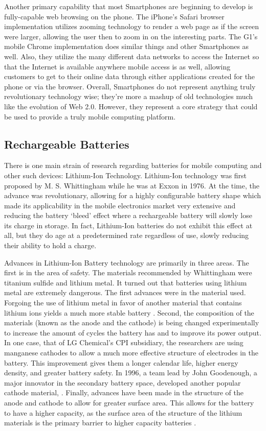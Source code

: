 Another primary capability that most Smartphones are beginning to develop is
fully-capable web browsing on the phone.  The iPhone's Safari browser
implementation utilizes zooming technology to render a web page as if the screen
were larger, allowing the user then to zoom in on the interesting parts.  The
G1's mobile Chrome implementation does similar things and other Smartphones as
well.  Also, they utilize the many different data networks to access the
Internet so that the Internet is available anywhere mobile access is as well,
allowing customers to get to their online data through either applications
created for the phone or via the browser.  Overall, Smartphones do not represent
anything truly revolutionary technology wise; they're more a mashup of old
technologies much like the evolution of Web 2.0.  However, they represent a core
strategy that could be used to provide a truly mobile computing platform.

\subsection{Rechargeable Batteries}

There is one main strain of research regarding batteries for mobile computing
and other such devices: Lithium-Ion Technology.  Lithium-Ion technology was
first proposed by M. S. Whittingham while he was at Exxon in 1976.  At the time,
the advance was revolutionary, allowing for a highly configurable battery shape
which made its applicability in the mobile electronics market very extensive and
reducing the battery `bleed' effect where a rechargeable battery will slowly
lose its charge in storage.  In fact, Lithium-Ion batteries do not exhibit this
effect at all, but they do age at a predetermined rate regardless of use, slowly
reducing their ability to hold a charge.

Advances in Lithium-Ion Battery technology are primarily in three areas.  The
first is in the area of safety.  The materials recommended by Whittingham were
titanium sulfide and lithium metal.  It turned out that batteries using lithium
metal are extremely dangerous.  The first advances were in the material used.
Forgoing the use of lithium metal in favor of another material that contains
lithium ions yields a much more stable battery \citep{samar1981}.  Second, the
composition of the materials (known as the anode and the cathode) is being
changed experimentally to increase the amount of cycles the battery has and to
improve its power output.  In one case, that of LG Chemical's CPI subsidiary,
the researchers are using manganese cathodes to allow a much more effective
structure of electrodes in the battery.  This improvement gives them a longer
calendar life, higher energy density, and greater battery safety.  In 1996, a
team lead by John Goodenough, a major innovator in the secondary battery space,
developed another popular cathode material, .  Finally, advances have
been made in the structure of the anode and cathode to allow for greater surface
area.  This allows for the battery to have a higher capacity, as the surface
area of the structure of the lithium materials is the primary barrier to higher
capacity batteries \citep{idota1997}.

